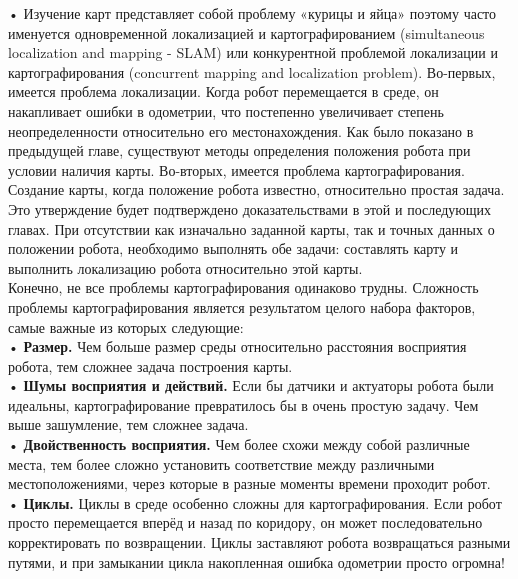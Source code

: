 \documentclass[10pt,a4paper]{article}
\begin{document}
•	Изучение карт представляет собой проблему «курицы и яйца» поэтому часто именуется одновременной локализацией и картографированием (simultaneous localization and mapping - SLAM) или конкурентной проблемой локализации и картографирования (concurrent mapping and localization problem). Во-первых, имеется проблема локализации. Когда робот перемещается в среде, он накапливает ошибки в одометрии, что постепенно увеличивает степень неопределенности относительно его местонахождения. Как было показано в предыдущей главе, существуют методы определения положения робота при условии наличия карты. Во-вторых, имеется проблема картографирования. Создание карты, когда положение робота известно, относительно простая задача. Это утверждение будет подтверждено доказательствами в этой и последующих главах. При отсутствии как изначально заданной карты, так и точных данных о положении робота, необходимо выполнять обе задачи: составлять карту и выполнить локализацию робота относительно этой карты.\\

Конечно, не все проблемы картографирования одинаково трудны. Сложность проблемы картографирования является результатом целого набора факторов, самые важные из которых следующие:\\

•	\textbf{Размер.} Чем больше размер среды относительно расстояния восприятия робота, тем сложнее задача построения карты.\\

•	\textbf{Шумы восприятия и действий.} Если бы датчики и актуаторы робота были идеальны, картографирование превратилось бы в очень простую задачу. Чем выше зашумление, тем сложнее задача.\\

•	\textbf{Двойственность восприятия.} Чем более схожи между собой различные места, тем более сложно установить соответствие между различными местоположениями, через которые в разные моменты времени проходит робот.\\

•\textbf{	Циклы.} Циклы в среде особенно сложны для картографирования. Если робот просто перемещается вперёд и назад по коридору, он может последовательно корректировать по возвращении. Циклы заставляют робота возвращаться разными путями, и при замыкании цикла накопленная ошибка одометрии просто огромна!\\
\end{document}
